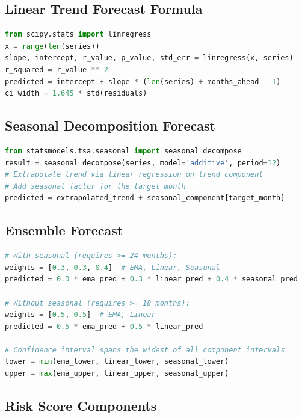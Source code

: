 \documentclass[11pt,a4paper]{article}
\begin{document}
\subsection{Linear Trend Forecast Formula}

\begin{lstlisting}[language=Python]
from scipy.stats import linregress
x = range(len(series))
slope, intercept, r_value, p_value, std_err = linregress(x, series)
r_squared = r_value ** 2
predicted = intercept + slope * (len(series) + months_ahead - 1)
ci_width = 1.645 * std(residuals)
\end{lstlisting}

\subsection{Seasonal Decomposition Forecast}

\begin{lstlisting}[language=Python]
from statsmodels.tsa.seasonal import seasonal_decompose
result = seasonal_decompose(series, model='additive', period=12)
# Extrapolate trend via linear regression on trend component
# Add seasonal factor for the target month
predicted = extrapolated_trend + seasonal_component[target_month]
\end{lstlisting}

\subsection{Ensemble Forecast}

\begin{lstlisting}[language=Python]
# With seasonal (requires >= 24 months):
weights = [0.3, 0.3, 0.4]  # EMA, Linear, Seasonal
predicted = 0.3 * ema_pred + 0.3 * linear_pred + 0.4 * seasonal_pred

# Without seasonal (requires >= 18 months):
weights = [0.5, 0.5]  # EMA, Linear
predicted = 0.5 * ema_pred + 0.5 * linear_pred

# Confidence interval spans the widest of all component intervals
lower = min(ema_lower, linear_lower, seasonal_lower)
upper = max(ema_upper, linear_upper, seasonal_upper)
\end{lstlisting}

\subsection{Risk Score Components}
\end{document}
